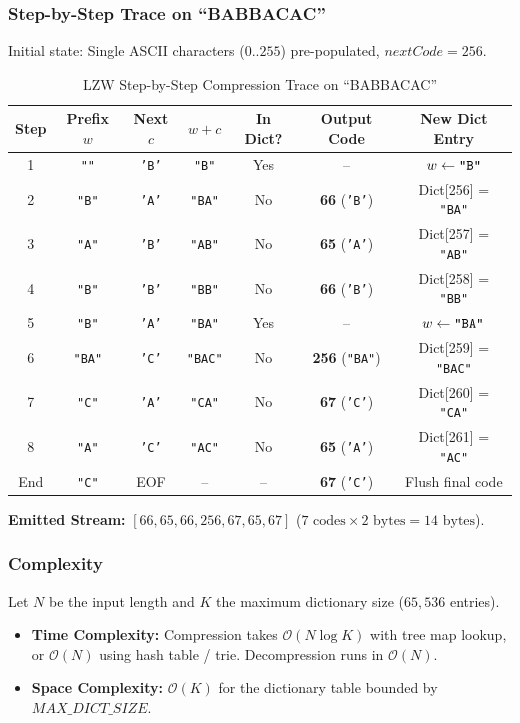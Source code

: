 \documentclass{article}
\begin{document}
\subsubsection{Step-by-Step Trace on ``BABBACAC''}
Initial state: Single ASCII characters ($0..255$) pre-populated, $nextCode = 256$.

\begin{table}[H]
\centering
\caption{LZW Step-by-Step Compression Trace on ``BABBACAC''}
\label{tab:lzw_trace}
\begin{tabular}{|c|c|c|c|c|c|c|}
\hline
\rowcolor{headergray}
\textbf{Step} & \textbf{Prefix $w$} & \textbf{Next $c$} & \textbf{$w+c$} & \textbf{In Dict?} & \textbf{Output Code} & \textbf{New Dict Entry} \\
\hline
1 & \texttt{""} & \texttt{'B'} & \texttt{"B"} & Yes & -- & $w \gets \text{\texttt{"B"}}$ \\ \hline
2 & \texttt{"B"} & \texttt{'A'} & \texttt{"BA"} & No & \textbf{66} (\texttt{'B'}) & Dict[256] = \texttt{"BA"} \\ \hline
3 & \texttt{"A"} & \texttt{'B'} & \texttt{"AB"} & No & \textbf{65} (\texttt{'A'}) & Dict[257] = \texttt{"AB"} \\ \hline
4 & \texttt{"B"} & \texttt{'B'} & \texttt{"BB"} & No & \textbf{66} (\texttt{'B'}) & Dict[258] = \texttt{"BB"} \\ \hline
5 & \texttt{"B"} & \texttt{'A'} & \texttt{"BA"} & Yes & -- & $w \gets \text{\texttt{"BA"}}$ \\ \hline
6 & \texttt{"BA"} & \texttt{'C'} & \texttt{"BAC"} & No & \textbf{256} (\texttt{"BA"}) & Dict[259] = \texttt{"BAC"} \\ \hline
7 & \texttt{"C"} & \texttt{'A'} & \texttt{"CA"} & No & \textbf{67} (\texttt{'C'}) & Dict[260] = \texttt{"CA"} \\ \hline
8 & \texttt{"A"} & \texttt{'C'} & \texttt{"AC"} & No & \textbf{65} (\texttt{'A'}) & Dict[261] = \texttt{"AC"} \\ \hline
End & \texttt{"C"} & EOF & -- & -- & \textbf{67} (\texttt{'C'}) & Flush final code \\ \hline
\end{tabular}
\end{table}

\textbf{Emitted Stream:} $[66, 65, 66, 256, 67, 65, 67]$ ($7\text{ codes} \times 2\text{ bytes} = 14\text{ bytes}$).

\subsubsection{Complexity}
Let $N$ be the input length and $K$ the maximum dictionary size ($65{,}536$ entries).
\begin{itemize}
    \item \textbf{Time Complexity:} Compression takes $\mathcal{O}(N \log K)$ with tree map lookup, or $\mathcal{O}(N)$ using hash table / trie. Decompression runs in $\mathcal{O}(N)$.
    \item \textbf{Space Complexity:} $\mathcal{O}(K)$ for the dictionary table bounded by $MAX\_DICT\_SIZE$.
\end{itemize}
\end{document}
